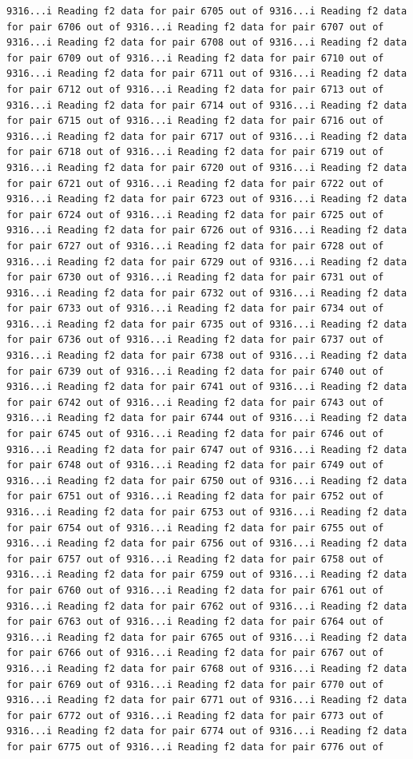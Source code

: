 \documentclass[
]{article}
\begin{document}
\begin{verbatim}
9316...i Reading f2 data for pair 6705 out of 9316...i Reading f2 data for pair 6706 out of 9316...i Reading f2 data for pair 6707 out of 9316...i Reading f2 data for pair 6708 out of 9316...i Reading f2 data for pair 6709 out of 9316...i Reading f2 data for pair 6710 out of 9316...i Reading f2 data for pair 6711 out of 9316...i Reading f2 data for pair 6712 out of 9316...i Reading f2 data for pair 6713 out of 9316...i Reading f2 data for pair 6714 out of 9316...i Reading f2 data for pair 6715 out of 9316...i Reading f2 data for pair 6716 out of 9316...i Reading f2 data for pair 6717 out of 9316...i Reading f2 data for pair 6718 out of 9316...i Reading f2 data for pair 6719 out of 9316...i Reading f2 data for pair 6720 out of 9316...i Reading f2 data for pair 6721 out of 9316...i Reading f2 data for pair 6722 out of 9316...i Reading f2 data for pair 6723 out of 9316...i Reading f2 data for pair 6724 out of 9316...i Reading f2 data for pair 6725 out of 9316...i Reading f2 data for pair 6726 out of 9316...i Reading f2 data for pair 6727 out of 9316...i Reading f2 data for pair 6728 out of 9316...i Reading f2 data for pair 6729 out of 9316...i Reading f2 data for pair 6730 out of 9316...i Reading f2 data for pair 6731 out of 9316...i Reading f2 data for pair 6732 out of 9316...i Reading f2 data for pair 6733 out of 9316...i Reading f2 data for pair 6734 out of 9316...i Reading f2 data for pair 6735 out of 9316...i Reading f2 data for pair 6736 out of 9316...i Reading f2 data for pair 6737 out of 9316...i Reading f2 data for pair 6738 out of 9316...i Reading f2 data for pair 6739 out of 9316...i Reading f2 data for pair 6740 out of 9316...i Reading f2 data for pair 6741 out of 9316...i Reading f2 data for pair 6742 out of 9316...i Reading f2 data for pair 6743 out of 9316...i Reading f2 data for pair 6744 out of 9316...i Reading f2 data for pair 6745 out of 9316...i Reading f2 data for pair 6746 out of 9316...i Reading f2 data for pair 6747 out of 9316...i Reading f2 data for pair 6748 out of 9316...i Reading f2 data for pair 6749 out of 9316...i Reading f2 data for pair 6750 out of 9316...i Reading f2 data for pair 6751 out of 9316...i Reading f2 data for pair 6752 out of 9316...i Reading f2 data for pair 6753 out of 9316...i Reading f2 data for pair 6754 out of 9316...i Reading f2 data for pair 6755 out of 9316...i Reading f2 data for pair 6756 out of 9316...i Reading f2 data for pair 6757 out of 9316...i Reading f2 data for pair 6758 out of 9316...i Reading f2 data for pair 6759 out of 9316...i Reading f2 data for pair 6760 out of 9316...i Reading f2 data for pair 6761 out of 9316...i Reading f2 data for pair 6762 out of 9316...i Reading f2 data for pair 6763 out of 9316...i Reading f2 data for pair 6764 out of 9316...i Reading f2 data for pair 6765 out of 9316...i Reading f2 data for pair 6766 out of 9316...i Reading f2 data for pair 6767 out of 9316...i Reading f2 data for pair 6768 out of 9316...i Reading f2 data for pair 6769 out of 9316...i Reading f2 data for pair 6770 out of 9316...i Reading f2 data for pair 6771 out of 9316...i Reading f2 data for pair 6772 out of 9316...i Reading f2 data for pair 6773 out of 9316...i Reading f2 data for pair 6774 out of 9316...i Reading f2 data for pair 6775 out of 9316...i Reading f2 data for pair 6776 out of 
\end{verbatim}
\end{document}
